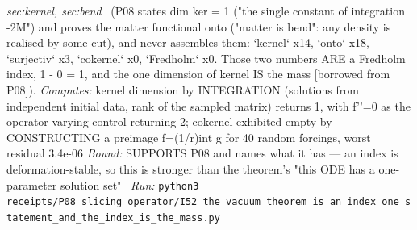 \begin{description}
\textit{sec:kernel, sec:bend} \ (P08 states dim ker = 1 ("the single constant of integration -2M") and proves the matter functional onto ("matter is bend": any density is realised by some cut), and never assembles them: `kernel` x14, `onto` x18, `surjectiv` x3, `cokernel` x0, `Fredholm` x0. Those two numbers ARE a Fredholm index, 1 - 0 = 1, and the one dimension of kernel IS the mass [borrowed from P08]). 
\emph{Computes:} kernel dimension by INTEGRATION (solutions from independent initial data, rank of the sampled matrix) returns 1, with f''=0 as the operator-varying control returning 2; cokernel exhibited empty by CONSTRUCTING a preimage f=(1/r)int g for 40 random forcings, worst residual 3.4e-06
 \emph{Bound:} SUPPORTS P08 and names what it has --- an index is deformation-stable, so this is stronger than the theorem's "this ODE has a one-parameter solution set"
\ \emph{Run:} \texttt{python3 receipts/P08\_slicing\_operator/I52\_the\_vacuum\_theorem\_is\_an\_index\_one\_statement\_and\_the\_index\_is\_the\_mass.py}
\end{description}\endgroup
